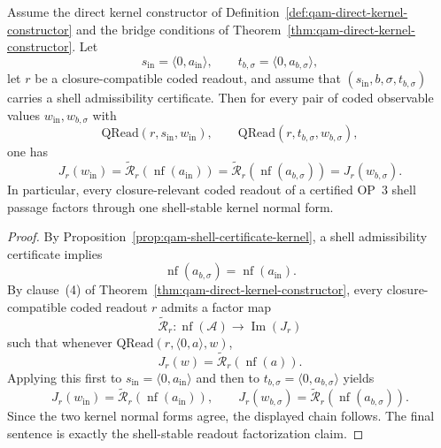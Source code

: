 \begin{theorem}\label{thm:qam-shell-stable-readout}
Assume the direct kernel constructor of Definition~\ref{def:qam-direct-kernel-constructor} and the bridge conditions of Theorem~\ref{thm:qam-direct-kernel-constructor}. Let
\[
s_{\mathrm{in}}=\langle 0,a_{\mathrm{in}}\rangle,
\qquad
 t_{b,\sigma}=\langle 0,a_{b,\sigma}\rangle,
\]
let $r$ be a closure-compatible coded readout, and assume that $(s_{\mathrm{in}},b,\sigma,t_{b,\sigma})$ carries a shell admissibility certificate. Then for every pair of coded observable values $w_{\mathrm{in}},w_{b,\sigma}$ with
\[
\mathrm{QRead}(r,s_{\mathrm{in}},w_{\mathrm{in}}),
\qquad
\mathrm{QRead}(r,t_{b,\sigma},w_{b,\sigma}),
\]
one has
\[
J_r(w_{\mathrm{in}})
=
\widetilde{\mathcal R}_r(\operatorname{nf}(a_{\mathrm{in}}))
=
\widetilde{\mathcal R}_r(\operatorname{nf}(a_{b,\sigma}))
=
J_r(w_{b,\sigma}).
\]
In particular, every closure-relevant coded readout of a certified OP~3 shell passage factors through one shell-stable kernel normal form.
\end{theorem}

\begin{proof}
By Proposition~\ref{prop:qam-shell-certificate-kernel}, a shell admissibility certificate implies
\[
\operatorname{nf}(a_{b,\sigma})=\operatorname{nf}(a_{\mathrm{in}}).
\]
By clause~(4) of Theorem~\ref{thm:qam-direct-kernel-constructor}, every closure-compatible coded readout $r$ admits a factor map
\[
\widetilde{\mathcal R}_r:\operatorname{nf}(\mathcal A)\to \operatorname{Im}(J_r)
\]
such that whenever $\mathrm{QRead}(r,\langle 0,a\rangle,w)$,
\[
J_r(w)=\widetilde{\mathcal R}_r(\operatorname{nf}(a)).
\]
Applying this first to $s_{\mathrm{in}}=\langle 0,a_{\mathrm{in}}\rangle$ and then to $t_{b,\sigma}=\langle 0,a_{b,\sigma}\rangle$ yields
\[
J_r(w_{\mathrm{in}})=\widetilde{\mathcal R}_r(\operatorname{nf}(a_{\mathrm{in}})),
\qquad
J_r(w_{b,\sigma})=\widetilde{\mathcal R}_r(\operatorname{nf}(a_{b,\sigma})).
\]
Since the two kernel normal forms agree, the displayed chain follows. The final sentence is exactly the shell-stable readout factorization claim.
\end{proof}

